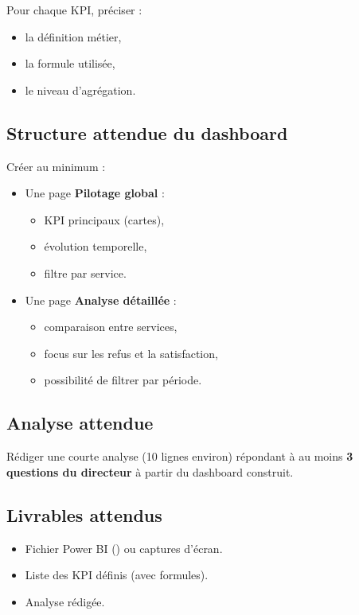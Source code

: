 \documentclass[11pt,a4paper]{article}
\begin{document}
Pour chaque KPI, préciser :

\begin{itemize}
  \item la définition métier,
  \item la formule utilisée,
  \item le niveau d’agrégation.
\end{itemize}

\subsection*{Structure attendue du dashboard}

Créer au minimum :

\begin{itemize}
  \item Une page \textbf{Pilotage global} :
  \begin{itemize}
    \item KPI principaux (cartes),
    \item évolution temporelle,
    \item filtre par service.
  \end{itemize}
  \item Une page \textbf{Analyse détaillée} :
  \begin{itemize}
    \item comparaison entre services,
    \item focus sur les refus et la satisfaction,
    \item possibilité de filtrer par période.
  \end{itemize}
\end{itemize}

\subsection*{Analyse attendue}

Rédiger une courte analyse (10 lignes environ) répondant à au moins
\textbf{3 questions du directeur} à partir du dashboard construit.

\subsection*{Livrables attendus}

\begin{itemize}
  \item Fichier Power BI () ou captures d’écran.
  \item Liste des KPI définis (avec formules).
  \item Analyse rédigée.
\end{itemize}
\end{document}
